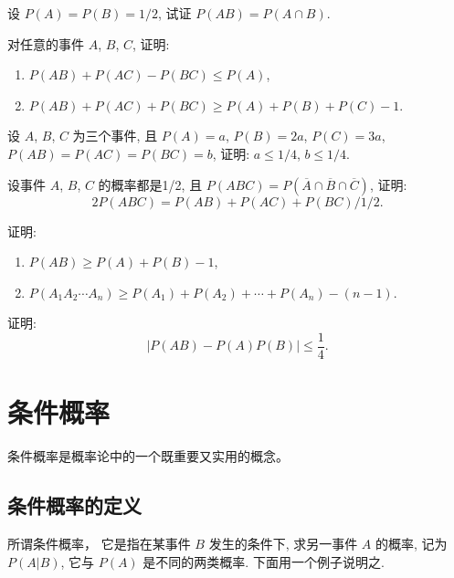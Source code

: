 \begin{xiti}
  \item 设 $P(A) = P(B) = 1/2$,
  试证 $P(AB) = P(A \cap B)$.

  \item 对任意的事件 $A$, $B$, $C$,
  证明:
  \begin{enumerate}
    \item $P (AB) + P (AC) - P (BC) \le P (A)$,
    \item $P (AB) + P (AC) + P (BC) \ge P (A) + P (B) + P (C) - 1$.
  \end{enumerate}

  \item 设 $A$, $B$, $C$ 为三个事件,
  且 $P(A) = a$, $P(B) = 2a$, $P(C) = 3a$,
  $P(AB) = P(AC) = P(BC) = b$,
  证明:
  $a \le 1/4$, $b \le 1/4$.

  \item 设事件 $A$, $B$, $C$ 的概率都是1/2,
  且 $P(ABC) = P(\overline{A} \cap \overline{B} \cap \overline{C})$,
  证明:
  \[
    2P(ABC) = P(AB) + P(AC) + P(BC) / 1/2.
  \]

  \item 证明:
  \begin{enumerate}
    \item $P(AB) \ge P(A) + P(B) - 1$,
    \item $P(A_1 A_2 \dotsb A_n) \ge P(A_1) + P(A_2) + \dotsb + P(A_n) - (n-1)$.
  \end{enumerate}

  \item 证明:
  \[
    \lvert P(AB) - P(A)P(B) \rvert \le \frac{1}{4}.
  \]
\end{xiti}

\section{条件概率}

条件概率是概率论中的一个既重要又实用的概念。

\subsection{条件概率的定义}

所谓条件概率，
它是指在某事件 $B$ 发生的条件下,
求另一事件 $A$ 的概率,
记为 $P(A|B)$,
它与 $P(A)$ 是不同的两类概率.
下面用一个例子说明之.

